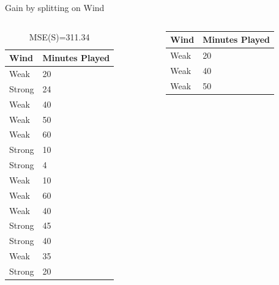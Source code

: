 \documentclass[usenames,dvipsnames]{beamer}
\begin{document}
\begin{frame}{Gain by splitting on Wind}
\begin{columns}

\begin{column}{.5\textwidth}
	\begin{scriptsize}

\begin{table}[]
	\begin{tabular}{@{}ll@{}}
		\toprule
		\textbf{Wind} & \textbf{Minutes Played} \\ \midrule
		Weak          & 20                      \\
		Strong        & 24                      \\
		Weak          & 40                      \\
		Weak          & 50                      \\
		Weak          & 60                      \\
		Strong        & 10                      \\
		Strong        & 4                       \\
		Weak          & 10                      \\
		Weak          & 60                      \\
		Weak          & 40                      \\
		Strong        & 45                      \\
		Strong        & 40                      \\
		Weak          & 35                      \\
		Strong        & 20                      \\ \bottomrule
	\end{tabular}
\caption{MSE(S)=311.34}
\end{table}
	\end{scriptsize}
\end{column}
\begin{column}{.5\textwidth}
	\begin{tiny}
\vspace{-5pt}		
\begin{table}[]
	\begin{tabular}{@{}ll@{}}
		\toprule
		\textbf{Wind} & \textbf{Minutes Played} \\ \midrule
		Weak          & 20                      \\
		Weak          & 40                      \\
		Weak          & 50                      \\

\end{tabular}
\end{table}
\end{tiny}
\end{column}
\end{columns}
\end{frame}
\end{document}

